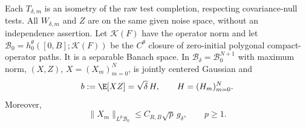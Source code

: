\begin{lemma}\label{L:raw-block-inputs}
  Each $T_{\delta,m}$ is an isometry of the raw test completion,
  respecting covariance-null tests. All $W_{\delta,m}$ and $Z$
  are on the same given noise space, without an independence assertion.
  Let $\mathcal K(F)$ have the operator norm and let
  $\mathscr B_0=h_0^\theta([0,B];\mathcal K(F))$ be the
  $C^\theta$ closure of zero-initial polygonal compact-operator paths.
  It is a separable Banach space. In
  $\mathscr B_\delta=\mathscr B_0^{N+1}$ with maximum norm,
  $(X,Z)$, $X=(X_m)_{m=0}^N$, is jointly centered Gaussian and
  \begin{equation}\label{E:raw-block-covariance}
    b:=\E[XZ]=\sqrt\delta\,H,\qquad H=(H_m)_{m=0}^N.
  \end{equation}
  Moreover,
  \begin{equation}\label{E:raw-block-moments}
    \|X_m\|_{L^p\mathscr B_0}
    \le C_{R,B}\sqrt p\,g_\delta,\qquad p\ge1.
  \end{equation}
\end{lemma}

